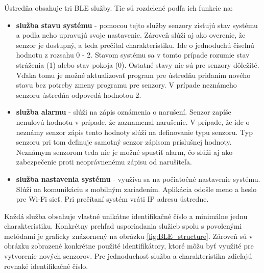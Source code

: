 Ústredňa obsahuje tri BLE služby. Tie sú rozdelené podľa ich funkcie na:
\begin{itemize}
    \item \textbf{služba stavu systému} - pomocou tejto služby senzory zisťujú stav systému a podľa neho upravujú svoje nastavenie. Zároveň slúži aj ako overenie, že senzor je dostupný, a teda prečítal charakteristiku. Ide o jednoduchú číselnú hodnotu z rozsahu 0 - 2. Stavom systému sa v tomto prípade rozumie stav stráženia (1) alebo stav pokoja (0). Ostatné stavy nie sú pre senzory dôležité. Vďaka tomu je možné aktualizovať program pre ústredňu pridaním nového stavu bez potreby zmeny programu pre senzory. V prípade neznámeho senzoru ústredňa odpovedá hodnotou 2.
    \item \textbf{služba alarmu} - slúži na zápis oznámenia o narušení. Senzor zapíše nenulovú hodnotu v prípade, že zaznamenal narušenie. V prípade, že ide o neznámy senzor zápis tento hodnoty slúži na definovanie typu senzoru. Typ senzoru pri tom definuje samotný senzor zápisom príslušnej hodnoty. Neznámym senzorom teda nie je možné spustiť alarm, čo slúži aj ako zabezpečenie proti neoprávnenému zápisu od narušiteľa.
    \item \textbf{služba nastavenia systému} - využíva sa na počiatočné nastavenie systému. Slúži na komunikáciu s mobilným zariadením. Aplikácia odošle meno a heslo pre Wi-Fi sieť. Pri prečítaní systém vráti IP adresu ústredne.
\end{itemize}

Každá služba obsahuje vlastné unikátne identifikačné číslo a minimálne jednu charakteristiku. Konkrétny prehľad usporiadania služieb spolu s povolenými metódami je graficky znázornený na obrázku \ref{fig:BLE_structure}. Zároveň sú v obrázku zobrazené konkrétne použité identifikátory, ktoré môžu byť využité pre vytvorenie nových senzorov. Pre jednoduchosť služba a charakteristika zdieľajú rovnaké identifikačné číslo. 

